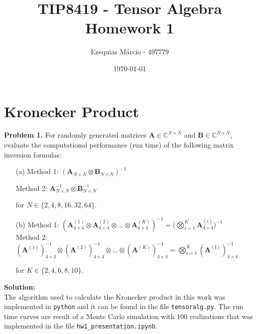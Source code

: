 \documentclass[12pt]{article}
\title{TIP8419 - Tensor Algebra\\ 
       Homework 1}
\author{Ezequias Márcio - $497779$}
\date{\today}
\begin{document}
\maketitle

\section*{Kronecker Product}\vspace{.5cm}

\noindent
\textbf{Problem 1.} For randomly generated matrices 
$\bm{A} \in \mathbb{C}^{N\times N}$ and $\bm{B}\in \mathbb{C}^{N\times N}$, 
evaluate the computational performance (run time) of the following matrix 
inversion formulas: 

\begin{itemize}
    \item [(a)] Method 1: $(\bm{A}_{N\times N}\otimes \bm{B}_{N\times N})^{-1}$
          
    Method 2: $\bm{A}^{-1}_{N\times N}\otimes \bm{B}^{-1}_{N\times N}$
    
    for $N \in \{2,4,8,16,32,64\}$.\\

    \item [(b)] Method 1: $(\bm{A}^{(1)}_{4\times 4}\otimes 
    \bm{A}^{(2)}_{4\times 4} \otimes ...\otimes 
    \bm{A}^{(K)}_{4\times 4})^{-1} = \bigg(\bigotimes\limits^{K}_{i = 1}
    \bm{A}^{(i)}_{4\times 4}\bigg)^{-1}$\\

    Method 2: $(\bm{A}^{(1)})^{-1}_{4\times 4}\otimes 
    (\bm{A}^{(2)})^{-1}_{4\times 4}\otimes ...\otimes 
    (\bm{A}^{(K)})^{-1}_{4\times 4} =\bigotimes\limits^{K}_{i = 1} 
    (\bm{A^{(i)}})^{-1}_{4\times 4}$

    for $K \in \{2,4,6,8,10\}$.

\end{itemize}

\noindent \textbf{Solution:}\\

The algorithm used to calculate the Kronecker product in this work was 
implemented in \texttt{python} and it can be found in the file 
\texttt{tensoralg.py}. The run time curves are result of a Monte Carlo 
simulation with $100$ realizations that was implemented in the file 
\texttt{hw1\_presentation.ipynb}.
\end{document}
